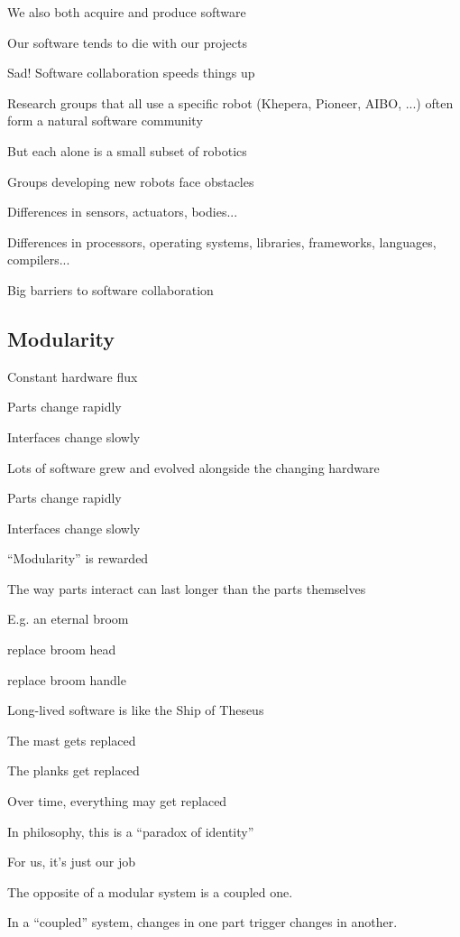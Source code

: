 We also both acquire and produce software

Our software tends to die with our projects

Sad!  Software collaboration speeds things up

Research groups that all use a specific robot (Khepera, Pioneer, AIBO,
...) often form a natural software community

But each alone is a small subset of robotics

Groups developing new robots face obstacles

Differences in sensors, actuators, bodies...

Differences in processors, operating systems, libraries, frameworks,
languages, compilers...

Big barriers to software collaboration




\subsection{Modularity}

Constant hardware flux

Parts change rapidly

Interfaces change slowly

Lots of software grew and evolved alongside the changing hardware

Parts change rapidly

Interfaces change slowly

``Modularity'' is rewarded


The way parts interact can last longer than the parts themselves

E.g. an eternal broom

replace broom head

replace broom handle


Long-lived software is like the Ship of Theseus

The mast gets replaced

The planks get replaced

Over time, everything may get replaced

In philosophy, this is a ``paradox of identity''

For us, it's just our job


The opposite of a modular system is a coupled one.

In a ``coupled'' system, changes in one part trigger changes in another.

